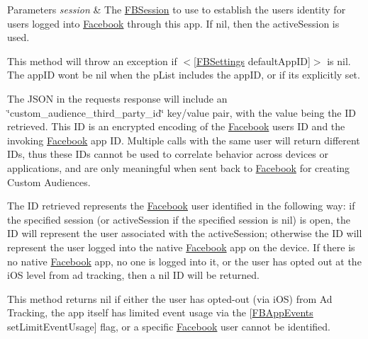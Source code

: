 \begin{DoxyParams}{Parameters}
{\em session} & The \hyperlink{interfaceFBSession}{F\+B\+Session} to use to establish the user\textquotesingle{}s identity for users logged into \hyperlink{interfaceFacebook}{Facebook} through this app. If {\ttfamily nil}, then the active\+Session is used.\\
\hline
\end{DoxyParams}
This method will throw an exception if $<$\mbox{[}\hyperlink{interfaceFBSettings}{F\+B\+Settings} default\+App\+ID\mbox{]}$>$ is {\ttfamily nil}. The app\+ID won\textquotesingle{}t be nil when the p\+List includes the app\+ID, or if it\textquotesingle{}s explicitly set.

The J\+S\+ON in the request\textquotesingle{}s response will include an \char`\"{}custom\+\_\+audience\+\_\+third\+\_\+party\+\_\+id\char`\"{} key/value pair, with the value being the ID retrieved. This ID is an encrypted encoding of the \hyperlink{interfaceFacebook}{Facebook} user\textquotesingle{}s ID and the invoking \hyperlink{interfaceFacebook}{Facebook} app ID. Multiple calls with the same user will return different I\+Ds, thus these I\+Ds cannot be used to correlate behavior across devices or applications, and are only meaningful when sent back to \hyperlink{interfaceFacebook}{Facebook} for creating Custom Audiences.

The ID retrieved represents the \hyperlink{interfaceFacebook}{Facebook} user identified in the following way\+: if the specified session (or active\+Session if the specified session is {\ttfamily nil}) is open, the ID will represent the user associated with the active\+Session; otherwise the ID will represent the user logged into the native \hyperlink{interfaceFacebook}{Facebook} app on the device. If there is no native \hyperlink{interfaceFacebook}{Facebook} app, no one is logged into it, or the user has opted out at the i\+OS level from ad tracking, then a {\ttfamily nil} ID will be returned.

This method returns {\ttfamily nil} if either the user has opted-\/out (via i\+OS) from Ad Tracking, the app itself has limited event usage via the {\ttfamily \mbox{[}\hyperlink{interfaceFBAppEvents}{F\+B\+App\+Events} set\+Limit\+Event\+Usage\mbox{]}} flag, or a specific \hyperlink{interfaceFacebook}{Facebook} user cannot be identified. \mbox{\label{interfaceFBRequest_a17f11f5dad042b4109b3a001300d6916}} 
